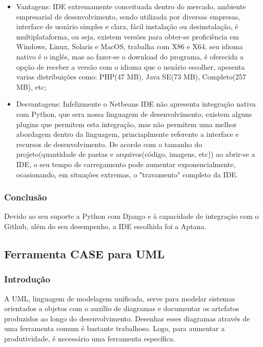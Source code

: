 \documentclass[12pt,a4paper]{article}
\begin{document}
			\begin{itemize}
				\item Vantagens:
				IDE extremamente conceituada dentro do mercado, ambiente empresarial de desenvolvimento, sendo utilizada por diversas empresas, interface de usuário simples e clara, fácil instalação ou desinstalação, é multiplataforma, ou seja, existem versões para obter-se proficiência em Windows, Linux, Solaris e MacOS, trabalha com X86 e X64, seu idioma nativo é o inglês, mas ao fazer-se o download do programa, é oferecida a opção de receber a versão com o idioma que o usuário escolher, apesenta varias distribuições como: PHP(47 MB), Java SE(73 MB), Completo(257 MB), etc;
				\item Desvantagens:
				 Infelizmente o Netbeans IDE não apresenta integração nativa com Python, que sera nossa linguagem de desenvolvimento, existem alguns plugins que permitem esta integração, mas não permitem uma melhor abordagem dentro da linguagem, princiaplmente referente a interface e recursos de desenvolvimento. 
				 De acordo com o tamanho do projeto(quantidade de pastas e arquivos(código, imagens, etc)) ao abrir-se a IDE, o seu tempo de carregamento pode aumentar exponencialmente, ocasionando, em situações extremas, o "travamento" completo da IDE.
			\end{itemize}
		
		\subsubsection{Conclusão}
		
			Devido ao seu suporte a Python com Django e à capacidade de integração com o Github, além do seu desempenho, a IDE escolhida foi
			a Aptana.

	\clearpage
	\subsection{Ferramenta CASE para UML}
	
		\subsubsection{Introdução}
		
			A UML, linguagem de modelagem unificada, serve para modelar sistemas orientados
			a objetos com o auxílio de diagramas e documentar os artefatos
			produzidos ao longo do desenvolvimento. Desenhar esses diagramas através de uma ferramenta
			comum é bastante trabalhoso. Logo, para aumentar a produtividade, é necessário
			uma ferramenta específica.
			
\end{document}
